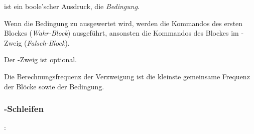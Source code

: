 \glq{}\grq ist ein boole'scher Ausdruck, die \emph{Bedingung}.

Wenn die Bedingung zu  ausgewertet wird, werden die Kommandos des ersten Blockes (\emph{Wahr-Block}) ausgeführt,
ansonsten die Kommandos des Blockes im -Zweig (\emph{Falsch-Block}).

Der -Zweig ist optional.

Die Berechnungsfrequenz der Verzweigung ist die kleinste gemeinsame Frequenz der Blöcke sowie der Bedingung.

\subsubsection{-Schleifen}\label{$_backslash$kw__for__-Schleifen}
:\label{schleife_for}\\
\hspace*{1cm}\glq{}\grq  \glq\Gt{(}\grq  \glq\Gt{;}\grq  \glq\Gt{;}\grq  \glq\Gt{)}\grq  \glq\Gt{\{}\grq  {}  \glq\Gt{\}}\grq \\
\hspace*{1cm}\glq{}\grq  \glq\Gt{(}\grq  \glq\Gt{;}\grq  \glq\Gt{;}\grq {}  \glq\Gt{)}\grq  \glq\Gt{\{}\grq  {}  \glq\Gt{\}}\grq \\
\hspace*{1cm}\glq{}\grq  \glq\Gt{(}\grq  \glq\Gt{;}\grq {}  \glq\Gt{;}\grq  \glq\Gt{)}\grq  \glq\Gt{\{}\grq  {}  \glq\Gt{\}}\grq \\
\hspace*{1cm}\glq{}\grq  \glq\Gt{(}\grq  \glq\Gt{;}\grq {}  \glq\Gt{;}\grq {}  \glq\Gt{)}\grq  \glq\Gt{\{}\grq  {}  \glq\Gt{\}}\grq \\
\hspace*{1cm}\glq{}\grq  \glq\Gt{(}\grq {}  \glq\Gt{;}\grq  \glq\Gt{;}\grq  \glq\Gt{)}\grq  \glq\Gt{\{}\grq  {}  \glq\Gt{\}}\grq \\
\hspace*{1cm}\glq{}\grq  \glq\Gt{(}\grq {}  \glq\Gt{;}\grq  \glq\Gt{;}\grq {}  \glq\Gt{)}\grq  \glq\Gt{\{}\grq  {}  \glq\Gt{\}}\grq \\

